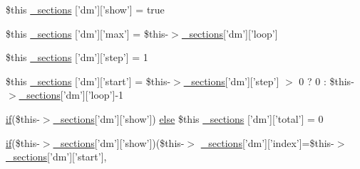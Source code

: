 \begin{DoxyCompactItemize}
\$this \hyperlink{default_234d6fa4bfd5eef6424a9ddc74a166350_2_06_06-14_05_06_06-1407541581_05method_8tpl_8php_adcd45fde1c19e7cd242ac459d32b0708}{\-\_\-sections} \mbox{[}'dm'\mbox{]}\mbox{[}'show'\mbox{]} = true
\item 
\$this \hyperlink{default_234d6fa4bfd5eef6424a9ddc74a166350_2_06_06-14_05_06_06-1407541581_05method_8tpl_8php_a6572cb532cf0546faf0f90667ffbfbba}{\-\_\-sections} \mbox{[}'dm'\mbox{]}\mbox{[}'max'\mbox{]} = \$this-\/$>$\hyperlink{_06_06127_05_06_0612781687_05pkgelementindex_8tpl_8php_a9e3d26b39edfe29c3f29b8035ef33828}{\-\_\-sections}\mbox{[}'dm'\mbox{]}\mbox{[}'loop'\mbox{]}
\item 
\$this \hyperlink{default_234d6fa4bfd5eef6424a9ddc74a166350_2_06_06-14_05_06_06-1407541581_05method_8tpl_8php_aeaa228c6e9d86248f096cc6bf71cea86}{\-\_\-sections} \mbox{[}'dm'\mbox{]}\mbox{[}'step'\mbox{]} = 1
\item 
\$this \hyperlink{default_234d6fa4bfd5eef6424a9ddc74a166350_2_06_06-14_05_06_06-1407541581_05method_8tpl_8php_a56294f0327392e22347573b64dc9fdb1}{\-\_\-sections} \mbox{[}'dm'\mbox{]}\mbox{[}'start'\mbox{]} = \$this-\/$>$\hyperlink{_06_06127_05_06_0612781687_05pkgelementindex_8tpl_8php_a9e3d26b39edfe29c3f29b8035ef33828}{\-\_\-sections}\mbox{[}'dm'\mbox{]}\mbox{[}'step'\mbox{]} $>$ 0 ? 0 \-: \$this-\/$>$\hyperlink{_06_06127_05_06_0612781687_05pkgelementindex_8tpl_8php_a9e3d26b39edfe29c3f29b8035ef33828}{\-\_\-sections}\mbox{[}'dm'\mbox{]}\mbox{[}'loop'\mbox{]}-\/1
\item 
\hyperlink{_setup_8inc_8php_ad0184337b31d13763ec8751feff4aabe}{if}(\$this-\/$>$\hyperlink{_06_06127_05_06_0612781687_05pkgelementindex_8tpl_8php_a9e3d26b39edfe29c3f29b8035ef33828}{\-\_\-sections}\mbox{[}'dm'\mbox{]}\mbox{[}'show'\mbox{]}) \*
\hyperlink{test__session_8php_a7ca5c3b9e4c46ab37c0418e95ddcfa36}{else} \$this \hyperlink{default_234d6fa4bfd5eef6424a9ddc74a166350_2_06_06-14_05_06_06-1407541581_05method_8tpl_8php_a9c02c7c777da7d5754945a333293f1d9}{\-\_\-sections} \mbox{[}'dm'\mbox{]}\mbox{[}'total'\mbox{]} = 0
\item 
\hyperlink{_setup_8inc_8php_ad0184337b31d13763ec8751feff4aabe}{if}(\$this-\/$>$\hyperlink{_06_06127_05_06_0612781687_05pkgelementindex_8tpl_8php_a9e3d26b39edfe29c3f29b8035ef33828}{\-\_\-sections}\mbox{[}'dm'\mbox{]}\mbox{[}'show'\mbox{]})(\$this-\/$>$\*
\hyperlink{_06_06127_05_06_0612781687_05pkgelementindex_8tpl_8php_a9e3d26b39edfe29c3f29b8035ef33828}{\-\_\-sections}\mbox{[}'dm'\mbox{]}\mbox{[}'index'\mbox{]}=\$this-\/$>$\*
\hyperlink{_06_06127_05_06_0612781687_05pkgelementindex_8tpl_8php_a9e3d26b39edfe29c3f29b8035ef33828}{\-\_\-sections}\mbox{[}'dm'\mbox{]}\mbox{[}'start'\mbox{]}, \*

\end{DoxyCompactItemize}
